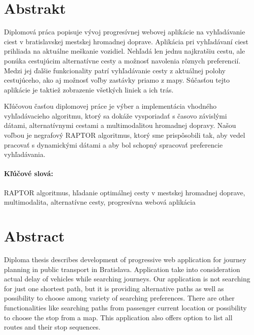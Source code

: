 \documentclass[12pt, oneside]{book}
\begin{document}

\newpage 
\section*{Abstrakt}
Diplomová práca popisuje vývoj progresívnej webovej aplikácie na vyhľadávanie ciest v bratislavskej mestskej hromadnej doprave. Aplikácia pri vyhľadávaní ciest prihliada na aktuálne meškanie vozidiel. Nehľadá len jednu najkratšiu cestu, ale ponúka cestujúcim alternatívne cesty a možnosť navolenia rôznych preferencií. Medzi jej ďalšie funkcionality patrí vyhľadávanie cesty z aktuálnej polohy cestujúceho, ako aj možnosť voľby zastávky priamo z mapy. Súčasťou tejto aplikácie je taktiež zobrazenie všetkých liniek a ich trás.

Kľúčovou časťou diplomovej práce je výber a implementácia vhodného vyhľadávacieho algoritmu, ktorý sa dokáže vysporiadať s časovo závislými dátami, alternatívnymi cestami a multimodalitou hromadnej dopravy. 
Našou voľbou je negrafový RAPTOR algoritmus, ktorý sme prispôsobili tak, aby vedel pracovať s dynamickými dátami a aby bol schopný spracovať preferencie vyhľadávania.

\paragraph*{Kľúčové slová:} 
RAPTOR algoritmus, hľadanie optimálnej cesty v mestskej hromadnej doprave, multimodalita, alternatívne cesty, progresívna webová aplikácia


\newpage 
\section*{Abstract}
Diploma thesis describes development of progressive web application for journey planning in public transport in Bratislava. Application take into consideration actual delay of vehicles while searching journeys. Our application is not searching for just one shortest path, but it is providing alternative paths as well as possibility to choose among variety of searching preferences. There are other functionalities like searching paths from passenger current location or possibility to choose the stop from a map. This application also offers option to list all routes and their stop sequences.
\end{document}
